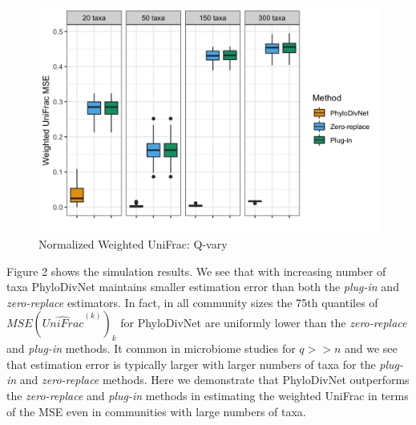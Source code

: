 \documentclass{article}
\newcommand*{\myfont}{\fontfamily{lmtt}\selectfont}
\begin{document}
\begin{figure}[!htb]
 \captionsetup{singlelinecheck = false, format= hang, justification = raggedright, font = sf, labelsep = space}
  \caption{Normalized Weighted UniFrac: Q-vary}
  \centering
  \includegraphics[width=\textwidth]{q_vary.png}
\end{figure}

Figure 2 shows the simulation results. We see that with increasing number of taxa {\myfont PhyloDivNet} maintains smaller estimation error than both the \textit{plug-in} and \textit{zero-replace} estimators. In fact, in all community sizes the 75th quantiles of ${MSE(\widehat{UniFrac}^{(k)})}_{k}$ for {\myfont PhyloDivNet} are uniformly lower than the \textit{zero-replace} and \textit{plug-in} methods. It common in microbiome studies for $q >> n$ and we see that estimation error is typically larger with larger numbers of taxa for the \textit{plug-in} and \textit{zero-replace} methods. Here we demonstrate that {\myfont PhyloDivNet} outperforms the \textit{zero-replace} and \textit{plug-in} methods in estimating the weighted UniFrac in terms of the MSE even in communities with large numbers of taxa.
\end{document}
